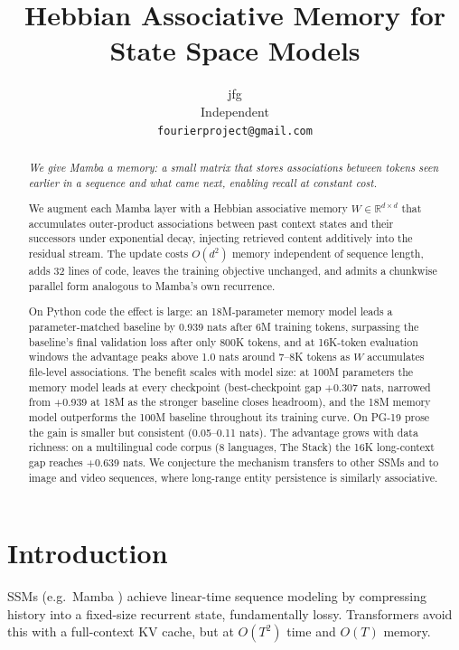 \documentclass{article}
\title{Hebbian Associative Memory for State Space Models}
\author{
  jfg \\
  Independent \\
  \texttt{fourierproject@gmail.com}
}
\begin{document}
\maketitle

\begin{abstract}
\textit{We give Mamba a memory: a small matrix that stores associations between tokens seen earlier in a sequence and what came next, enabling recall at constant cost.}

We augment each Mamba layer with a Hebbian associative memory $W \in \mathbb{R}^{d \times d}$ that accumulates outer-product associations between past context states and their successors under exponential decay, injecting retrieved content additively into the residual stream. The update costs $O(d^2)$ memory independent of sequence length, adds 32 lines of code, leaves the training objective unchanged, and admits a chunkwise parallel form analogous to Mamba's own recurrence.

On Python code the effect is large: an 18M-parameter memory model leads a parameter-matched baseline by 0.939 nats after 6M training tokens, surpassing the baseline's final validation loss after only 800K tokens, and at 16K-token evaluation windows the advantage peaks above 1.0 nats around 7--8K tokens as $W$ accumulates file-level associations. The benefit scales with model size: at 100M parameters the memory model leads at every checkpoint (best-checkpoint gap $+$0.307 nats, narrowed from $+$0.939 at 18M as the stronger baseline closes headroom), and the 18M memory model outperforms the 100M baseline throughout its training curve. On PG-19 prose the gain is smaller but consistent (0.05--0.11 nats). The advantage grows with data richness: on a multilingual code corpus (8 languages, The Stack) the 16K long-context gap reaches $+$0.639 nats. We conjecture the mechanism transfers to other SSMs and to image and video sequences, where long-range entity persistence is similarly associative.
\end{abstract}

\section{Introduction}

SSMs (e.g.\ Mamba \citep{gu2023mamba}) achieve linear-time sequence modeling by compressing history into a fixed-size recurrent state, fundamentally lossy. Transformers avoid this with a full-context KV cache, but at $O(T^2)$ time and $O(T)$ memory.
\end{document}
